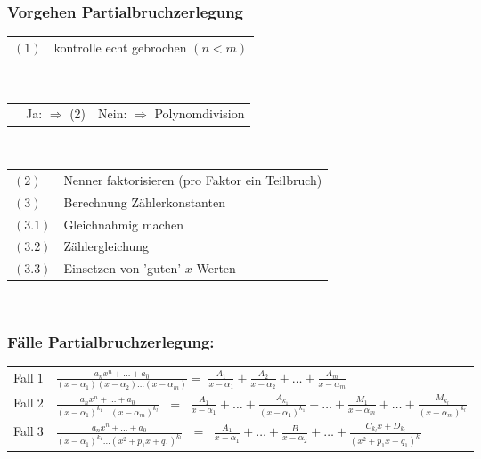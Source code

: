 \subsubsection{Vorgehen Partialbruchzerlegung}
\begin{tabular}{l l}
$(1)$   & \hspace{5.5pt}kontrolle echt gebrochen $(n < m)$
\end{tabular}\\
\begin{tabular}{l l l}
        & \hspace{13.5pt} Ja: $\Rightarrow$ (2) & Nein: $\Rightarrow$ Polynomdivision \\
\end{tabular}\\
\begin{tabular}{l l}
    $(2)$   & Nenner faktorisieren (pro Faktor ein Teilbruch)\\
    $(3)$   & Berechnung Zählerkonstanten\\
    $(3.1)$ & Gleichnahmig machen\\
    $(3.2)$ & Zählergleichung\\
    $(3.3)$ & Einsetzen von ’guten’ $x$-Werten
\end{tabular}\\
\subsubsection{Fälle Partialbruchzerlegung:}

\renewcommand{\arraystretch}{1.5}
\begin{tabular}{l l}
    Fall$\;1$   & $ \frac{a_nx^n + \ldots + a_0}{(x-\alpha_1)(x-\alpha_2)\ldots(x-\alpha_m)}  = \; \frac{A_1}{x-\alpha_1} + \frac{A_2}{x-\alpha_2} + \ldots + \frac{A_m}{x-\alpha_m}$\\
    Fall$\;2$   & $ \frac{a_nx^n + \ldots + a_0}{(x-\alpha_1)^{k_1}\ldots(x-\alpha_m)^{k_l}} \;\,\, = \;\; \frac{A_1}{x-\alpha_1} + \ldots + \frac{A_{k_1}}{(x-\alpha_1)^{k_1}} + \ldots + \frac{M_1}{x-\alpha_m} + \ldots + \frac{M_{k_{\scriptscriptstyle l}}}{(x-\alpha_m)^{k_l}}$\\
    Fall$\;3$   & $ \frac{a_nx^n + \ldots + a_0}{(x-\alpha_1)^{k_1}\ldots(x^2+p_1x+q_1)^{k_l}}\;\,\, = \;\; \frac{A_1}{x-\alpha_1} + \ldots + \frac{B}{x-\alpha_2} + \ldots + \frac{C_{k_{\scriptscriptstyle l}}x+D_{k_l}}{(x^2+p_1x+q_1)^{k_l}}$\\
\end{tabular}\\
\renewcommand{\arraystretch}{1.5}
